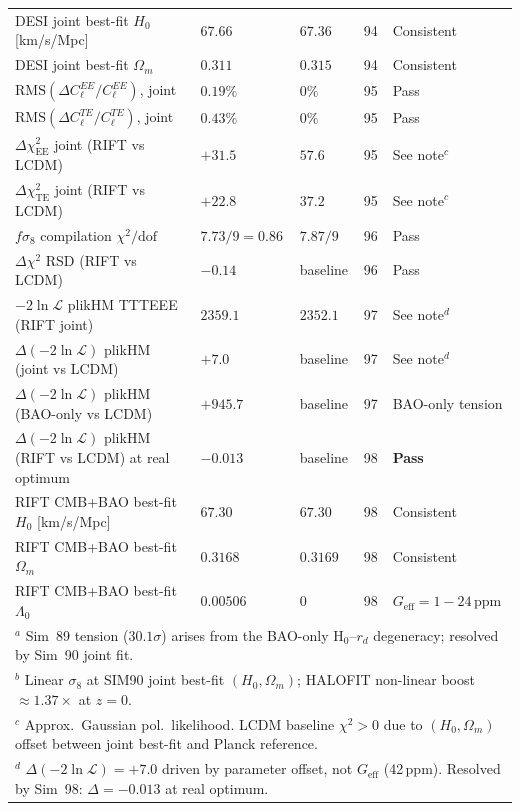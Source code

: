\documentclass[12pt,a4paper]{article}
\begin{document}
\begin{table}[ht]
\begin{tabular}{lllll}
DESI joint best-fit $H_0$ [km/s/Mpc] & $67.66$ & $67.36$ & 94 & Consistent \\
DESI joint best-fit $\Omega_m$ & $0.311$ & $0.315$ & 94 & Consistent \\
$\mathrm{RMS}(\Delta C_\ell^{EE}/C_\ell^{EE})$, joint & $0.19\%$ & $0\%$ & 95 & Pass \\
$\mathrm{RMS}(\Delta C_\ell^{TE}/C_\ell^{TE})$, joint & $0.43\%$ & $0\%$ & 95 & Pass \\
$\Delta\chi^2_\mathrm{EE}$ joint (RIFT vs LCDM) & $+31.5$ & $57.6$ & 95 & See note$^c$ \\
$\Delta\chi^2_\mathrm{TE}$ joint (RIFT vs LCDM) & $+22.8$ & $37.2$ & 95 & See note$^c$ \\
$f\sigma_8$ compilation $\chi^2/\mathrm{dof}$ & $7.73/9=0.86$ & $7.87/9$ & 96 & Pass \\
$\Delta\chi^2$ RSD (RIFT vs LCDM) & $-0.14$ & baseline & 96 & Pass \\
$-2\ln\mathcal{L}$ plikHM TTTEEE (RIFT joint) & $2359.1$ & $2352.1$ & 97 & See note$^d$ \\
$\Delta(-2\ln\mathcal{L})$ plikHM (joint vs LCDM) & $+7.0$ & baseline & 97 & See note$^d$ \\
$\Delta(-2\ln\mathcal{L})$ plikHM (BAO-only vs LCDM) & $+945.7$ & baseline & 97 & BAO-only tension \\
\midrule
$\Delta(-2\ln\mathcal{L})$ plikHM (RIFT vs LCDM) at real optimum & $\mathbf{-0.013}$ & baseline & 98 & \textbf{Pass} \\
RIFT CMB+BAO best-fit $H_0$ [km/s/Mpc] & $67.30$ & $67.30$ & 98 & Consistent \\
RIFT CMB+BAO best-fit $\Omega_m$ & $0.3168$ & $0.3169$ & 98 & Consistent \\
RIFT CMB+BAO best-fit $\Lambda_0$ & $0.00506$ & $0$ & 98 & $G_\mathrm{eff}=1-24\,\mathrm{ppm}$ \\
\bottomrule
\multicolumn{5}{l}{\footnotesize $^a$ Sim~89 tension ($30.1\sigma$) arises from the BAO-only H$_0$--$r_d$ degeneracy; resolved by Sim~90 joint fit.} \\
\multicolumn{5}{l}{\footnotesize $^b$ Linear $\sigma_8$ at SIM90 joint best-fit $(H_0,\Omega_m)$; HALOFIT non-linear boost $\approx 1.37\times$ at $z=0$.} \\
\multicolumn{5}{l}{\footnotesize $^c$ Approx.\ Gaussian pol.\ likelihood. LCDM baseline $\chi^2>0$ due to $(H_0,\Omega_m)$ offset between joint best-fit and Planck reference.} \\
\multicolumn{5}{l}{\footnotesize $^d$ $\Delta(-2\ln\mathcal{L})=+7.0$ driven by parameter offset, not $G_\mathrm{eff}$ (42\,ppm). Resolved by Sim~98: $\Delta=-0.013$ at real optimum.}
\end{tabular}
\end{table}
\end{document}
